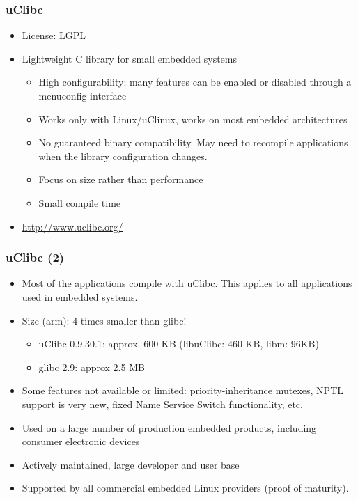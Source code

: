\begin{frame}
  \frametitle{uClibc}
  \begin{itemize}
  \item License: LGPL
  \item Lightweight C library for small embedded systems
    \begin{itemize}
    \item High configurability: many features can be enabled or
      disabled through a menuconfig interface
    \item Works only with Linux/uClinux, works on most embedded
      architectures
    \item No guaranteed binary compatibility. May need to 
      recompile applications when the library configuration changes.
    \item Focus on size rather than performance
    \item Small compile time
    \end{itemize}
  \item \url{http://www.uclibc.org/}
  \end{itemize}
\end{frame}

\begin{frame}
  \frametitle{uClibc (2)}
  \begin{itemize}
  \item Most of the applications compile with uClibc. This applies to
    all applications used in embedded systems.
  \item Size (arm): 4 times smaller than glibc!
    \begin{itemize}
    \item uClibc 0.9.30.1: approx. 600 KB (libuClibc: 460 KB, libm:
      96KB)
    \item glibc 2.9: approx 2.5 MB
    \end{itemize}
  \item Some features not available or limited: priority-inheritance
    mutexes, NPTL support is very new, fixed Name Service Switch
    functionality, etc.
  \item Used on a large number of production embedded products,
    including consumer electronic devices
  \item Actively maintained, large developer and user base
  \item Supported by all commercial embedded Linux providers (proof of
        maturity).
\end{itemize}
\end{frame}

